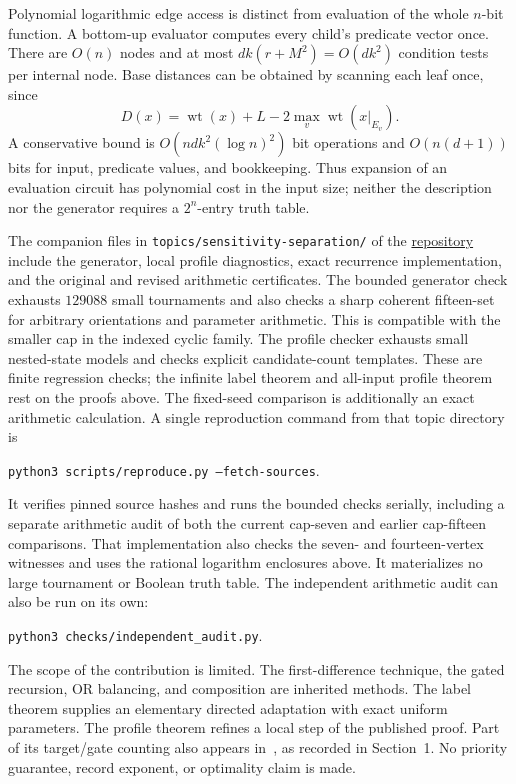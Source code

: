 \documentclass[11pt]{amsart}
\theoremstyle{definition}
\theoremstyle{remark}
\newcommand{\wt}{\operatorname{wt}}
\begin{document}
Polynomial logarithmic edge access is distinct from evaluation of the
whole $n$-bit function. A bottom-up evaluator computes every child's
predicate vector once. There are $O(n)$ nodes and at most
$d k(r+M^2)=O(dk^2)$ condition tests per internal node. Base distances
can be obtained by scanning each leaf once, since
\[
 D(x)=\wt(x)+L-2\max_v\wt(x|_{E_v}).
\]
A conservative bound is $O(ndk^2(\log n)^2)$ bit operations and
$O(n(d+1))$ bits for input, predicate values, and bookkeeping. Thus
expansion of an evaluation circuit has polynomial cost in the input
size; neither the description nor the generator requires a $2^n$-entry
truth table.

The companion files in \nolinkurl{topics/sensitivity-separation/} of the
\href{https://github.com/shjvandekamp/math}{repository} include the
generator, local profile diagnostics, exact recurrence implementation,
and the original and revised arithmetic certificates. The bounded generator check
exhausts $129088$ small tournaments and also checks a sharp coherent
fifteen-set for arbitrary orientations and parameter arithmetic. This is
compatible with the smaller cap in the indexed cyclic family.
The profile checker exhausts small
nested-state models and checks explicit candidate-count templates.
These are finite regression checks; the infinite label theorem and
all-input profile theorem rest on the proofs above. The fixed-seed
comparison is additionally an exact arithmetic calculation. A single
reproduction command from that topic directory is
\begin{center}
\texttt{python3 scripts/reproduce.py --fetch-sources}.
\end{center}
It verifies pinned source hashes and runs the bounded checks serially,
including a separate arithmetic audit of both the current cap-seven and
earlier cap-fifteen comparisons. That implementation
also checks the seven- and fourteen-vertex witnesses and uses the rational
logarithm enclosures above. It materializes no large tournament or Boolean
truth table. The independent arithmetic audit can also be run on its own:
\begin{center}
\texttt{python3 checks/independent\_audit.py}.
\end{center}

The scope of the contribution is limited. The first-difference technique,
the gated recursion, OR balancing, and composition are inherited methods.
The label theorem supplies an elementary directed adaptation with exact
uniform parameters. The profile theorem refines a local step of the
published proof. Part of its target/gate counting also appears
in~\cite{ProveItII}, as recorded in Section~1. No priority guarantee, record
exponent, or optimality claim is made.
\end{document}
